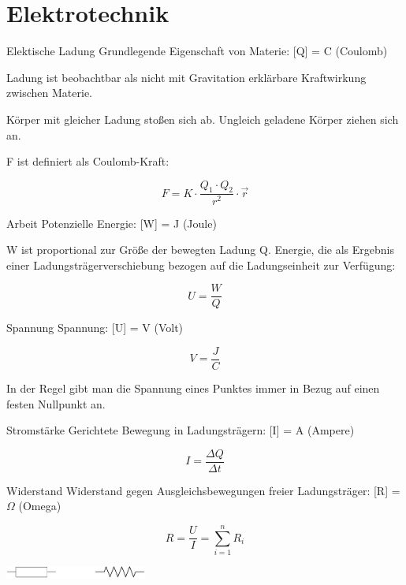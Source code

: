 \section{Elektrotechnik}

\begin{defi}{Elektische Ladung}
    Grundlegende Eigenschaft von Materie: [Q] = C (Coulomb)

    Ladung ist beobachtbar als nicht mit Gravitation erklärbare Kraftwirkung zwischen Materie.

    Körper mit gleicher Ladung stoßen sich ab.
    Ungleich geladene Körper ziehen sich an.

    F ist definiert als Coulomb-Kraft:

    \[
        F = K \cdot \frac{Q_1 \cdot Q_2}{r^2} \cdot \vec{r}
    \]
\end{defi}

\begin{defi}{Arbeit}
    Potenzielle Energie: [W] = J (Joule)

    W ist proportional zur Größe der bewegten Ladung Q.
    Energie, die als Ergebnis einer Ladungsträgerverschiebung bezogen auf die Ladungseinheit zur Verfügung:

    \[
        U = \frac{W}{Q}
    \]
\end{defi}

\begin{defi}{Spannung}
    Spannung: [U] = V (Volt)

    \[
        V = \frac{J}{C}
    \]

    In der Regel gibt man die Spannung eines Punktes immer in Bezug auf einen festen Nullpunkt an.
\end{defi}

\begin{defi}{Stromstärke}
    Gerichtete Bewegung in Ladungsträgern: [I] = A (Ampere)

    \[
        I = \frac{\Delta Q}{\Delta t}
    \]
\end{defi}

\begin{defi}{Widerstand}
    Widerstand gegen Ausgleichsbewegungen freier Ladungsträger: [R] = $\Omega$ (Omega)

    \[
        R = \frac{U}{I} = \sum_{i = 1}^n R_i
    \]

    \begin{center}
        \includegraphics[width=0.35\textwidth]{includes/figures/widerstand.pdf}
    \end{center}
\end{defi}

